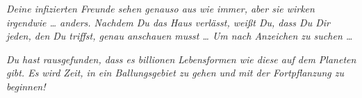 {\itshape Deine infizierten Freunde sehen genauso aus wie immer, aber sie wirken irgendwie … anders.
Nachdem Du das Haus verlässt, weißt Du, dass Du Dir jeden, den Du triffst, genau anschauen musst … Um nach Anzeichen zu suchen …
}

{\itshape Du hast rausgefunden, dass es billionen Lebensformen wie diese auf dem Planeten gibt. Es wird Zeit, in ein Ballungsgebiet zu gehen und mit der Fortpflanzung zu beginnen!}